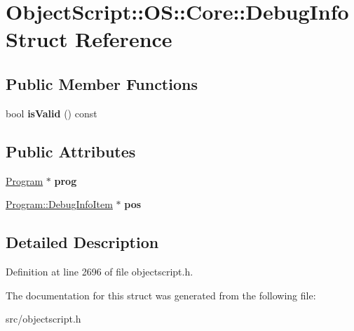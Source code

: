 \hypertarget{struct_object_script_1_1_o_s_1_1_core_1_1_debug_info}{}\section{Object\+Script\+:\+:OS\+:\+:Core\+:\+:Debug\+Info Struct Reference}
\label{struct_object_script_1_1_o_s_1_1_core_1_1_debug_info}
\subsection*{Public Member Functions}
\begin{DoxyCompactItemize}
\item 
bool {\bfseries is\+Valid} () const \hypertarget{struct_object_script_1_1_o_s_1_1_core_1_1_debug_info_ac8cdcf95fd8107a1989ca7e255a90551}{}\label{struct_object_script_1_1_o_s_1_1_core_1_1_debug_info_ac8cdcf95fd8107a1989ca7e255a90551}

\end{DoxyCompactItemize}
\subsection*{Public Attributes}
\begin{DoxyCompactItemize}
\item 
\hyperlink{class_object_script_1_1_o_s_1_1_core_1_1_program}{Program} $\ast$ {\bfseries prog}\hypertarget{struct_object_script_1_1_o_s_1_1_core_1_1_debug_info_a66d71872b3f6cdcd322da253364571ac}{}\label{struct_object_script_1_1_o_s_1_1_core_1_1_debug_info_a66d71872b3f6cdcd322da253364571ac}

\item 
\hyperlink{struct_object_script_1_1_o_s_1_1_core_1_1_program_1_1_debug_info_item}{Program\+::\+Debug\+Info\+Item} $\ast$ {\bfseries pos}\hypertarget{struct_object_script_1_1_o_s_1_1_core_1_1_debug_info_add596f26e722c3362809be208d0028a3}{}\label{struct_object_script_1_1_o_s_1_1_core_1_1_debug_info_add596f26e722c3362809be208d0028a3}

\end{DoxyCompactItemize}


\subsection{Detailed Description}


Definition at line 2696 of file objectscript.\+h.



The documentation for this struct was generated from the following file\+:\begin{DoxyCompactItemize}
\item 
src/objectscript.\+h\end{DoxyCompactItemize}
